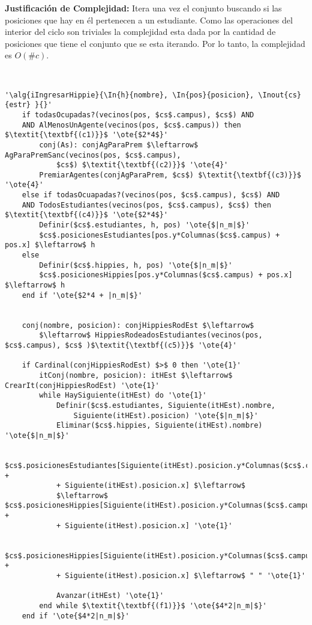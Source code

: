 \textbf{Justificación de Complejidad:} Itera una vez el conjunto buscando si las posiciones que hay en él pertenecen a un estudiante. Como las operaciones del interior del ciclo son triviales la complejidad esta dada por la cantidad de posiciones que tiene el conjunto que se esta iterando. Por lo tanto, la complejidad es $O(\#c)$.

~

\begin{lstlisting}[mathescape]
'\alg{iIngresarHippie}{\In{h}{nombre}, \In{pos}{posicion}, \Inout{cs}{estr} }{}'
	if todasOcupadas?(vecinos(pos, $cs$.campus), $cs$) AND
	AND AlMenosUnAgente(vecinos(pos, $cs$.campus)) then $\textit{\textbf{(c1)}}$ '\ote{$2*4$}'
		conj(As): conjAgParaPrem $\leftarrow$ AgParaPremSanc(vecinos(pos, $cs$.campus),
			$cs$) $\textit{\textbf{(c2)}}$ '\ote{4}'
		PremiarAgentes(conjAgParaPrem, $cs$) $\textit{\textbf{(c3)}}$ '\ote{4}'
	else if todasOcuapadas?(vecinos(pos, $cs$.campus), $cs$) AND
	AND TodosEstudiantes(vecinos(pos, $cs$.campus), $cs$) then $\textit{\textbf{(c4)}}$ '\ote{$2*4$}'
		Definir($cs$.estudiantes, h, pos) '\ote{$|n_m|$}'
		$cs$.posicionesEstudiantes[pos.y*Columnas($cs$.campus) + pos.x] $\leftarrow$ h
	else
		Definir($cs$.hippies, h, pos) '\ote{$|n_m|$}'
		$cs$.posicionesHippies[pos.y*Columnas($cs$.campus) + pos.x] $\leftarrow$ h
	end if '\ote{$2*4 + |n_m|$}'


	conj(nombre, posicion): conjHippiesRodEst $\leftarrow$
		$\leftarrow$ HippiesRodeadosEstudiantes(vecinos(pos, $cs$.campus), $cs$ )$\textit{\textbf{(c5)}}$ '\ote{4}'

	if Cardinal(conjHippiesRodEst) $>$ 0 then '\ote{1}'
		itConj(nombre, posicion): itHEst $\leftarrow$ CrearIt(conjHippiesRodEst) '\ote{1}'
		while HaySiguiente(itHEst) do '\ote{1}'
			Definir($cs$.estudiantes, Siguiente(itHEst).nombre,
				Siguiente(itHEst).posicion) '\ote{$|n_m|$}'
			Eliminar($cs$.hippies, Siguiente(itHEst).nombre) '\ote{$|n_m|$}'

			$cs$.posicionesEstudiantes[Siguiente(itHEst).posicion.y*Columnas($cs$.campus) +
			+ Siguiente(itHEst).posicion.x] $\leftarrow$
			$\leftarrow$ $cs$.posicionesHippies[Siguiente(itHEst).posicion.y*Columnas($cs$.campus) +
			+ Siguiente(itHest).posicion.x] '\ote{1}'

			$cs$.posicionesHippies[Siguiente(itHEst).posicion.y*Columnas($cs$.campus) +
			+ Siguiente(itHest).posicion.x] $\leftarrow$ " " '\ote{1}'

			Avanzar(itHEst) '\ote{1}'
		end while $\textit{\textbf{(f1)}}$ '\ote{$4*2|n_m|$}'
	end if '\ote{$4*2|n_m|$}'



\end{lstlisting}
